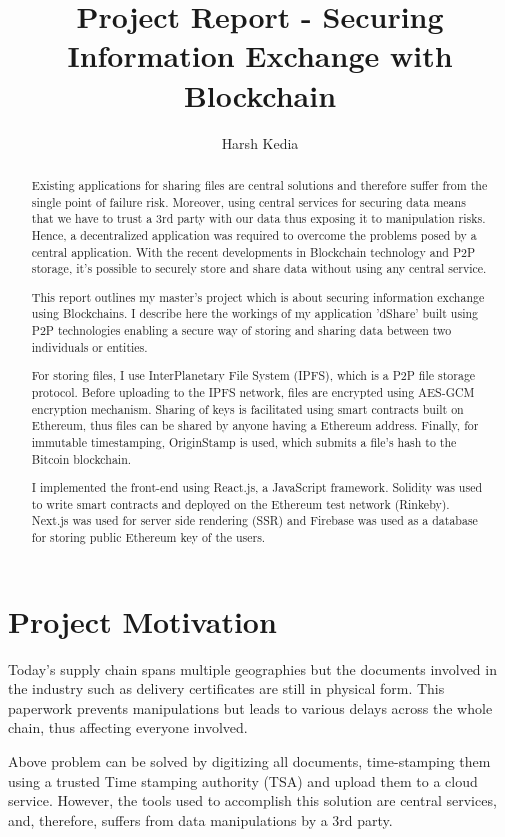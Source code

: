 \documentclass[]{report}
\title{Project Report - Securing Information Exchange with Blockchain}
\author{Harsh Kedia}
\begin{document}
	\maketitle

	\begin{abstract}
		Existing applications for sharing files are central solutions and therefore suffer from the single point of failure risk. Moreover, using central services for securing data means that we have to trust a 3rd party with our data thus exposing it to manipulation risks. Hence, a decentralized application was required to overcome the problems posed by a central application. With the recent developments in Blockchain technology and P2P storage, it's possible to securely store and share data without using any central service.
		
		This report outlines my master's project which is about securing information exchange using Blockchains. I describe here the workings of my application 'dShare' built using P2P technologies enabling a secure way of storing and sharing data between two individuals or entities.
		
		For storing files, I use InterPlanetary File System (IPFS), which is a P2P file storage protocol. Before uploading to the IPFS network, files are encrypted using AES-GCM encryption mechanism. Sharing of keys is facilitated using smart contracts built on Ethereum, thus files can be shared by anyone having a Ethereum address. Finally, for immutable timestamping, OriginStamp is used, which submits a file's hash to the Bitcoin blockchain.
		
		
		I implemented the front-end using React.js, a JavaScript framework. Solidity was used to write smart contracts and deployed on the Ethereum test network (Rinkeby). Next.js was used for server side rendering (SSR) and Firebase was used as a database for storing public Ethereum key of the users.
	\end{abstract}

	\section*{Project Motivation}
		Today's supply chain spans multiple geographies but the documents involved in the industry such as delivery certificates are still in physical form. This paperwork prevents manipulations but leads to various delays across the whole chain, thus affecting everyone involved.
		
		Above problem can be solved by digitizing all documents, time-stamping them using a trusted Time stamping authority (TSA) and upload them to a cloud service. However, the tools used to accomplish this solution are central services, and, therefore, suffers from data manipulations by a 3rd party.
		
\end{document}
